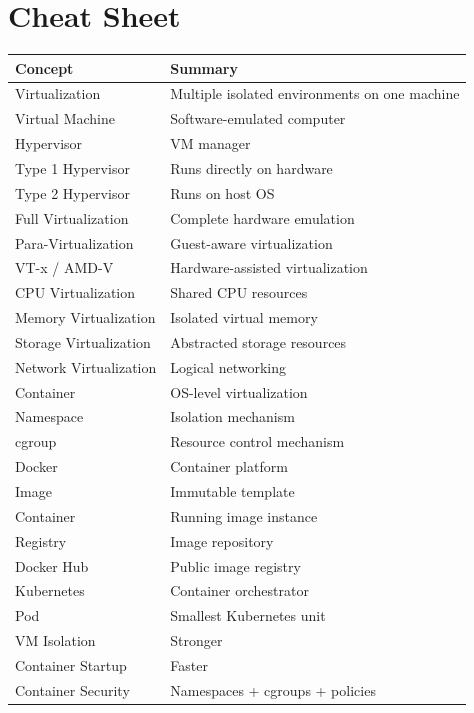 \section{Cheat Sheet}

\begin{longtable}{|p{5cm}|p{8cm}|}
\hline
Concept & Summary \\
\hline
Virtualization & Multiple isolated environments on one machine \\
\hline
Virtual Machine & Software-emulated computer \\
\hline
Hypervisor & VM manager \\
\hline
Type 1 Hypervisor & Runs directly on hardware \\
\hline
Type 2 Hypervisor & Runs on host OS \\
\hline
Full Virtualization & Complete hardware emulation \\
\hline
Para-Virtualization & Guest-aware virtualization \\
\hline
VT-x / AMD-V & Hardware-assisted virtualization \\
\hline
CPU Virtualization & Shared CPU resources \\
\hline
Memory Virtualization & Isolated virtual memory \\
\hline
Storage Virtualization & Abstracted storage resources \\
\hline
Network Virtualization & Logical networking \\
\hline
Container & OS-level virtualization \\
\hline
Namespace & Isolation mechanism \\
\hline
cgroup & Resource control mechanism \\
\hline
Docker & Container platform \\
\hline
Image & Immutable template \\
\hline
Container & Running image instance \\
\hline
Registry & Image repository \\
\hline
Docker Hub & Public image registry \\
\hline
Kubernetes & Container orchestrator \\
\hline
Pod & Smallest Kubernetes unit \\
\hline
VM Isolation & Stronger \\
\hline
Container Startup & Faster \\
\hline
Container Security & Namespaces + cgroups + policies \\
\hline
\end{longtable}